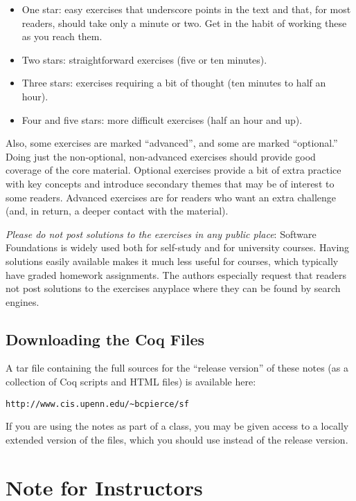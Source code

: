 \begin{itemize}
\item
  One star: easy exercises that underscore points in the text and that,
  for most readers, should take only a minute or two. Get in the habit
  of working these as you reach them.
\item
  Two stars: straightforward exercises (five or ten minutes).
\item
  Three stars: exercises requiring a bit of thought (ten minutes to half
  an hour).
\item
  Four and five stars: more difficult exercises (half an hour and up).
\end{itemize}

Also, some exercises are marked ``advanced'', and some are marked
``optional.'' Doing just the non-optional, non-advanced exercises should
provide good coverage of the core material. Optional exercises provide a
bit of extra practice with key concepts and introduce secondary themes
that may be of interest to some readers. Advanced exercises are for
readers who want an extra challenge (and, in return, a deeper contact
with the material).

\emph{Please do not post solutions to the exercises in any public
place}: Software Foundations is widely used both for self-study and for
university courses. Having solutions easily available makes it much less
useful for courses, which typically have graded homework assignments.
The authors especially request that readers not post solutions to the
exercises anyplace where they can be found by search engines.

\subsection{Downloading the Coq Files}\label{downloading-the-coq-files}

A tar file containing the full sources for the ``release version'' of
these notes (as a collection of Coq scripts and HTML files) is available
here:

\begin{verbatim}
http://www.cis.upenn.edu/~bcpierce/sf
\end{verbatim}

If you are using the notes as part of a class, you may be given access
to a locally extended version of the files, which you should use instead
of the release version.

\section{Note for Instructors}\label{note-for-instructors}

